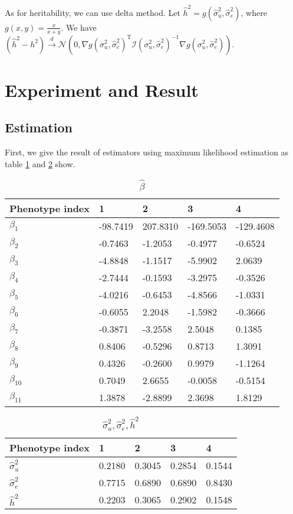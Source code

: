 \documentclass{article}
\begin{document}
As for heritability, we can use delta method. Let $ \hat{h}^{2} = g(\hat{\sigma}^{2}_{u}, \hat{\sigma}^{2}_{e}) $, where $ g(x,y) = \frac{x}{x+y} $.  We have $ (\hat{h}^{2} - h^{2}) \xrightarrow{d} \mathcal{N}(0, \nabla g(\sigma^{2}_{u}, \hat{\sigma}^{2}_{e})^{\text{T}} \mathcal{I}(\sigma^{2}_{u}, \hat{\sigma}^{2}_{e})^{-1} \nabla g(\sigma^{2}_{u}, \hat{\sigma}^{2}_{e}) ) $.

\section{Experiment and Result}

\subsection{Estimation}

First, we give the result of estimators using maximum likelihood estimation as table \ref{table_beta} and \ref{table_sigma_h} show.

\begin{table}[htbp]
	\caption{$ \hat{\beta} $}
	\label{table_beta}
	\centering
	\begin{tabular}{lllll}
		\toprule
		Phenotype index	& 1 & 2 & 3 & 4 \\
		\midrule
		$ \beta_1 $ & -98.7419 & 207.8310 & -169.5053 & -129.4608 \\
		$ \beta_2 $ & -0.7463 & -1.2053 & -0.4977 & -0.6524 \\
		$ \beta_3 $ & -4.8848 & -1.1517 & -5.9902 & 2.0639 \\
		$ \beta_4 $ & -2.7444 & -0.1593 & -3.2975 & -0.3526 \\
		$ \beta_5 $ & -4.0216 & -0.6453 & -4.8566 & -1.0331 \\
		$ \beta_6 $ & -0.6055 & 2.2048 & -1.5982 & -0.3666 \\
		$ \beta_7 $ & -0.3871 & -3.2558 & 2.5048 & 0.1385 \\
		$ \beta_8 $ & 0.8406 & -0.5296 & 0.8713 & 1.3091 \\
		$ \beta_9 $ & 0.4326 & -0.2600 & 0.9979 & -1.1264 \\
		$ \beta_{10} $ & 0.7049 & 2.6655 & -0.0058 & -0.5154 \\
		$ \beta_{11} $ & 1.3878 & -2.8899 & 2.3698 & 1.8129 \\
		\bottomrule
	\end{tabular}
\end{table}

\begin{table}[htbp]
	\caption{$ \hat{\sigma}^{2}_{u}, \hat{\sigma}^{2}_{e}, \hat{h}^{2} $}
	\label{table_sigma_h}
	\centering
	\begin{tabular}{lllll}
		\toprule
		Phenotype index	& 1 & 2 & 3 & 4 \\
		\midrule
		$ \hat{\sigma}^{2}_{u} $ & 0.2180 & 0.3045 & 0.2854 & 0.1544 \\
		$ \hat{\sigma}^{2}_{e} $ & 0.7715 & 0.6890 & 0.6890 & 0.8430 \\
		$ \hat{h}^{2} $ & 0.2203 & 0.3065 & 0.2902 & 0.1548 \\
		\bottomrule
	\end{tabular}
\end{table}
\end{document}
